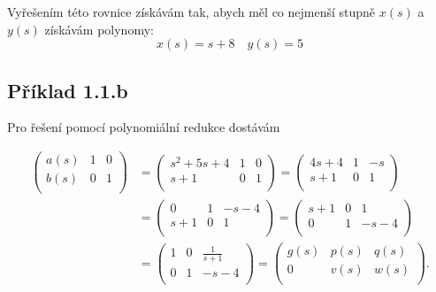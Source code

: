 \documentclass[12pt]{article}
\begin{document}
Vyřešením této rovnice získávám tak, abych měl co nejmenší stupně $x(s)$ a $y(s)$ získávám polynomy: 
\begin{equation}
  x(s) = s + 8 \quad y(s) = 5
\end{equation}

\subsection{Příklad 1.1.b}
Pro řešení pomocí polynomiální redukce dostávám

\begin{equation}
  \begin{aligned}
    \begin{pmatrix}
      a(s) & 1 & 0 \\
      b(s) & 0 & 1 \\
    \end{pmatrix}
    &=
    \begin{pmatrix}
      s^2 + 5s + 4 & 1 & 0 \\
      s + 1 & 0 & 1 \\
    \end{pmatrix}
    =
    \begin{pmatrix}
      4s + 4 & 1 & -s \\
      s + 1 & 0 & 1 \\
    \end{pmatrix} \\
    &=
    \begin{pmatrix}
      0 & 1 & -s-4 \\
      s + 1 & 0 & 1 \\
    \end{pmatrix}
    =
    \begin{pmatrix}
      s + 1 & 0 & 1 \\
      0 & 1 & -s - 4 \\
    \end{pmatrix} \\
    &=
    \begin{pmatrix}
      1 & 0 & \frac{1}{s + 1} \\
      0 & 1 & -s - 4 \\
    \end{pmatrix}
    =
    \begin{pmatrix}
      g(s) & p(s) & q(s) \\
      0 & v(s) & w(s) \\
    \end{pmatrix}.
  \end{aligned}
\end{equation}
\end{document}
